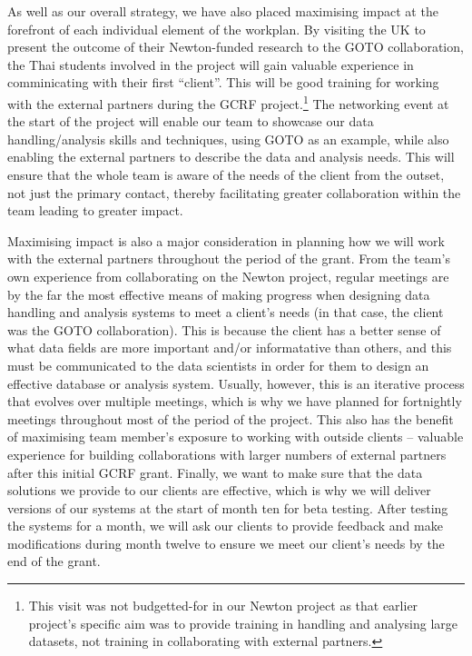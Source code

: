 \documentclass[11pt]{article}
\begin{document}
\vspace{2mm}
\noindent
As well as our overall strategy, we have also placed maximising impact at the forefront of each individual element of the workplan. By visiting the UK to present the outcome of their Newton-funded research to the GOTO collaboration, the Thai students involved in the project will gain valuable experience in comminicating with their first ``client''. This will be good training for working with the external partners during the GCRF project.\footnote{This visit was not budgetted-for in our Newton project as that earlier project's specific aim was to provide training in handling and analysing large datasets, not training in collaborating with external partners.} The networking event at the start of the project will enable our team to showcase our data handling/analysis skills and techniques, using GOTO as an example, while also enabling the external partners to describe the data and analysis needs. This will ensure that the whole team is aware of the needs of the client from the outset, not just the primary contact, thereby facilitating greater collaboration within the team leading to greater impact.

\vspace{2mm}
\noindent
Maximising impact is also a major consideration in planning how we will work with the external partners throughout the period of the grant. From the team's own experience from collaborating on the Newton project, regular meetings are by the far the most effective means of making progress when designing data handling and analysis systems to meet a client's needs (in that case, the client was the GOTO collaboration). This is because the client has a better sense of what data fields are more important and/or informatative than others, and this must be communicated to the data scientists in order for them to design an effective database or analysis system. Usually, however, this is an iterative process that evolves over multiple meetings, which is why we have planned for fortnightly meetings throughout most of the period of the project. This also has the benefit of maximising team member's exposure to working with outside clients -- valuable experience for building collaborations with larger numbers of external partners after this initial GCRF grant. Finally, we want to make sure that the data solutions we provide to our clients are effective, which is why we will deliver versions of our systems at the start of month ten for beta testing. After testing the systems for a month, we will ask our clients to provide feedback and make modifications during month twelve to ensure we meet our client's needs by the end of the grant. 
\end{document}
